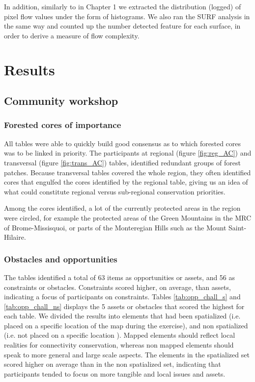 In addition, similarly to in Chapter 1 we extracted the distribution (logged) of pixel flow values under the form of histograms. We also ran the SURF analysis in the same way and counted up the number detected feature for each surface, in order to derive a measure of flow complexity.\\

\section{Results}

\subsection{Community workshop}

\subsubsection{Forested cores of importance} 

All tables were able to quickly build good consensus as to which forested cores was to be linked in priority. The participants at regional (figure \ref{fig:reg_AC}) and transversal (figure \ref{fig:trans_AC}) tables, identified redundant groups of forest patches. Because transversal tables covered the whole region, they often identified cores that engulfed the cores identified by the regional table, giving us an idea of what could constitute regional versus sub-regional conservation priorities.

Among the cores identified, a lot of the currently protected areas in the region were circled, for example the protected areas of the Green Mountains in the MRC of Brome-Missisquoi, or parts of the Monteregian Hills such as the Mount Saint-Hilaire.  \\ %

\subsubsection{Obstacles and opportunities}

The tables identified a total of 63 items as opportunities or assets, and 56 as constraints or obstacles. Constraints scored higher, on average, than assets, indicating a focus of participants on constraints. Tables \ref{tab:opp_chall_s} and \ref{tab:opp_chall_ns} displays the 5 assets or obstacles that scored the highest for each table. We divided the results into elements that had been spatialized (i.e. placed on a specific location of the map during the exercise), and non spatialized (i.e. not placed on a specific location ). Mapped elements should reflect local realities for connectivity conservation, whereas non mapped elements should speak to more general and large scale aspects. The elements in the spatialized set scored higher on average than in the non spatialized set, indicating that participants tended to focus on more tangible and local issues and assets.

